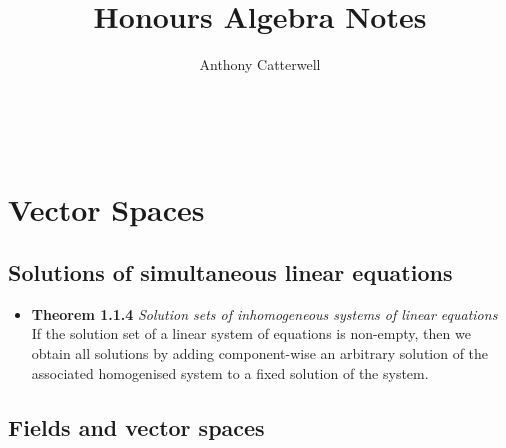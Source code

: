 \documentclass[11pt,a4paper]{article}
\title{Honours Algebra Notes}
\author{Anthony Catterwell}
\begin{document}
\maketitle
\tableofcontents

\break\

\section{Vector Spaces}

\subsection{Solutions of simultaneous linear equations}

\begin{itemize}

    \item \textbf{Theorem 1.1.4} \emph{Solution sets of inhomogeneous systems of linear
        equations} \\
        If the solution set of a linear system of equations is non-empty,
        then we obtain all solutions by adding component-wise an arbitrary solution
        of the associated homogenised system to a fixed solution of the system.
\end{itemize}

\subsection{Fields and vector spaces}
\end{document}
